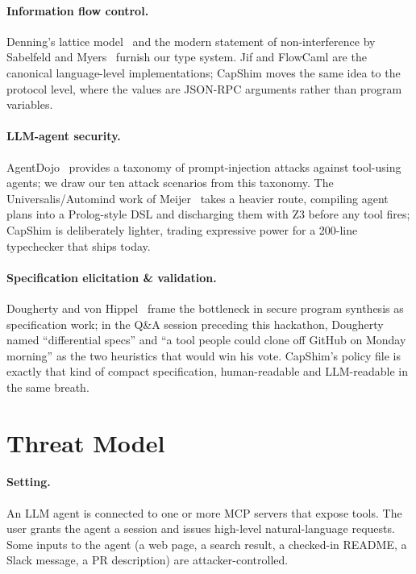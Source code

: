 \documentclass[11pt,a4paper]{article}
\begin{document}
\paragraph{Information flow control.} Denning's lattice
model~\cite{denning1976lattice} and the modern statement of
non-interference by Sabelfeld and Myers~\cite{sabelfeld2003language}
furnish our type system. Jif and FlowCaml are the canonical
language-level implementations; CapShim moves the same idea to the
protocol level, where the values are JSON-RPC arguments rather than
program variables.

\paragraph{LLM-agent security.} AgentDojo~\cite{debenedetti2024agentdojo}
provides a taxonomy of prompt-injection attacks against tool-using
agents; we draw our ten attack scenarios from this taxonomy. The
Universalis/Automind work of Meijer~\cite{meijer2026universalis}
takes a heavier route, compiling agent plans into a Prolog-style DSL
and discharging them with Z3 before any tool fires; CapShim is
deliberately lighter, trading expressive power for a 200-line
typechecker that ships today.

\paragraph{Specification elicitation \& validation.} Dougherty and
von Hippel~\cite{dougherty2026tractable} frame the bottleneck in
secure program synthesis as specification work; in the Q\&A session
preceding this hackathon, Dougherty named ``differential specs'' and
``a tool people could clone off GitHub on Monday morning'' as the
two heuristics that would win his vote. CapShim's policy file is
exactly that kind of compact specification, human-readable and
LLM-readable in the same breath.

\section{Threat Model}

\paragraph{Setting.} An LLM agent is connected to one or more MCP
servers that expose tools. The user grants the agent a session and
issues high-level natural-language requests. Some inputs to the
agent (a web page, a search result, a checked-in README, a Slack
message, a PR description) are attacker-controlled.
\end{document}
